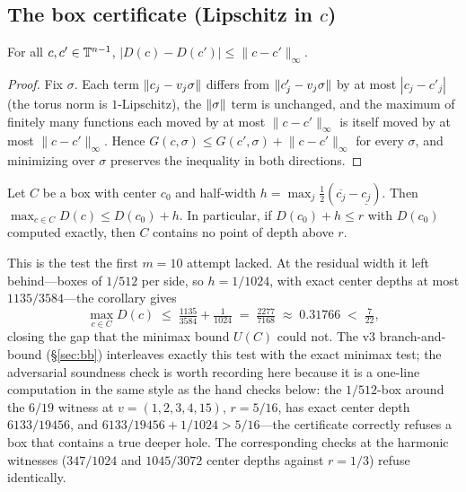 \subsection{The box certificate (Lipschitz in \texorpdfstring{$c$}{c})}

\begin{lemma}\label{lem:clip}
For all $c,c'\in\mathbb{T}^{n-1}$,
$\lvert D(c)-D(c')\rvert\le\lVert c-c'\rVert_\infty$.
\end{lemma}

\begin{proof}
Fix $\sigma$. Each term $\lVert c_j-v_j\sigma \rVert$ differs from
$\lVert c'_j-v_j\sigma \rVert$ by at most $|c_j-c'_j|$ (the torus norm is
$1$-Lipschitz), the $\lVert \sigma \rVert$ term is unchanged, and the maximum of
finitely many functions each moved by at most
$\lVert c-c'\rVert_\infty$ is itself moved by at most
$\lVert c-c'\rVert_\infty$. Hence
$G(c,\sigma)\le G(c',\sigma)+\lVert c-c'\rVert_\infty$ for every
$\sigma$, and minimizing over $\sigma$ preserves the inequality in
both directions.
\end{proof}

\begin{corollary}\label{cor:box}
Let $C$ be a box with center $c_0$ and half-width
$h=\max_j\tfrac12(\overline{c_j}-\underline{c_j})$. Then
$\max_{c\in C}D(c)\le D(c_0)+h$. In particular, if $D(c_0)+h\le r$
with $D(c_0)$ computed exactly, then $C$ contains no point of depth
above $r$.
\end{corollary}

This is the test the first $m=10$ attempt lacked. At the residual
width it left behind---boxes of $1/512$ per side, so $h=1/1024$, with
exact center depths at most $1135/3584$---the corollary gives
\[
\max_{c\in C}D(c)\;\le\;\tfrac{1135}{3584}+\tfrac{1}{1024}
\;=\;\tfrac{2277}{7168}\;\approx\;0.31766\;<\;\tfrac{7}{22},
\]
closing the gap that the minimax bound $U(C)$ could not. The v3
branch-and-bound (\S\ref{sec:bb}) interleaves exactly this test with
the exact minimax
test; the adversarial soundness check is worth recording here because
it is a one-line computation in the same style as the hand checks
below: the $1/512$-box around the $6/19$ witness at
$v=(1,2,3,4,15)$, $r=5/16$, has exact center depth $6133/19456$, and
$6133/19456+1/1024>5/16$---the certificate correctly refuses a box
that contains a true deeper hole. The corresponding checks at the
harmonic witnesses ($347/1024$ and $1045/3072$ center depths against
$r=1/3$) refuse identically.

